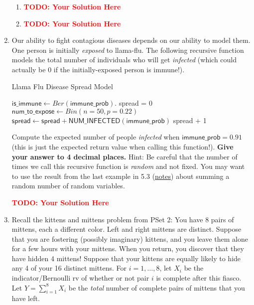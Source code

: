 \documentclass[12pt]{article}
\def\todo#1{\textcolor{red}{\textbf{#1}}}
\renewcommand{\|}{\mid}
\begin{document}
\begin{enumerate}
\begin{tcolorbox}
\begin{enumerate}
\item \todo{TODO: Your Solution Here}
\item \todo{TODO: Your Solution Here}
\end{enumerate}
\end{tcolorbox}

\item Our ability to fight contagious diseases depends on our ability to model them. One person is initially \textit{exposed} to llama-flu. The following recursive function models the total number of individuals who will get \textit{infected} (which could actually be $0$ if the initially-exposed person is immune!). 

\begin{algorithm}
\caption{Llama Flu Disease Spread Model}
\begin{algorithmic}[1]
\State $\textsf{is\_immune}\gets Ber(\textsf{immune\_prob})$. 
     
\EndIf
\State \textsf{spread} = 0
\State $\textsf{num\_to\_expose}\gets Bin(n=50, p=0.22)$ 
\State $\textsf{spread}\gets \textsf{spread} + \textsf{NUM\_INFECTED}(\textsf{immune\_prob})$
\EndFor
\Return \textsf{spread} + 1  
\EndFunction
\end{algorithmic}
\end{algorithm}

Compute the expected number of people \textit{infected} when $\textsf{immune\_prob}=0.91$ (this is just the expected return value when calling this function!). \textbf{Give your answer to 4 decimal places.} Hint: Be careful that the number of times we call this recursive function is \textit{random} and not fixed. You may want to use the result from the last example in 5.3 (\textcolor{blue}{\href{https://drive.google.com/file/d/1_obRAE1NxQY1mWJLPBFMInnb8_M1mt1-/view}{notes}}) about summing a random number of random variables. 

\begin{tcolorbox}
\todo{TODO: Your Solution Here}
\end{tcolorbox}

\item Recall the kittens and mittens problem from PSet 2: You have 8 pairs of mittens, each a different color. Left and right mittens are distinct. Suppose
that you are fostering (possibly imaginary) kittens, and you leave them alone for a few hours
with your mittens. When you return, you discover that they have hidden 4 mittens! Suppose
that your kittens are equally likely to hide any 4 of your 16 distinct mittens. For $i=1,\dots,8$, let $X_i$ be the indicator/Bernoulli rv of whether or not pair $i$ is complete after this fiasco. Let $Y=\sum_{i=1}^{8}{X_i}$ be the \textit{total}
number of complete pairs of mittens that you have left.


\end{enumerate}
\end{document}
